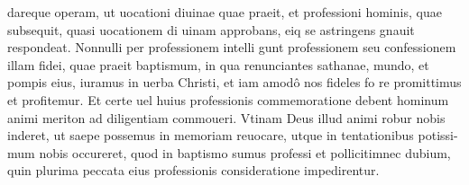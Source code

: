 \documentclass{article}
\begin{document}
\begin{pages}
dareque operam, ut uocationi diuinae quae praeit, et professioni hominis, quae subsequit, quasi uocationem di uinam approbans, eiq se astringens gnauit respondeat. Nonnulli per professionem intelli gunt professionem seu confessionem illam fidei, quae praeit baptismum, in qua renunciantes sathanae, mundo, et pompis eius, iuramus in uerba Christi, et iam amodô nos fideles fo re promittimus et profitemur. Et certe uel huius professionis commemoratione debent hominum animi meriton ad diligentiam commoueri. Vtinam Deus illud animi robur nobis inderet, ut saepe possemus in memoriam reuocare, utque in tentationibus potissi- mum nobis occureret, quod in baptismo sumus professi et pollicitimnec dubium, quin plurima peccata eius professionis consideratione impedirentur.  \pend
{}
{}

\end{pages}
\end{document}
